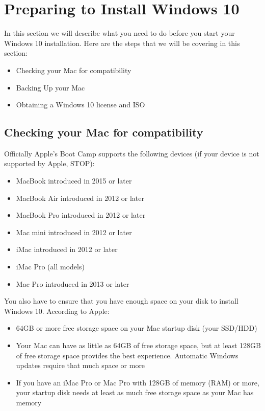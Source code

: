 \documentclass[11pt,twoside,titlepage]{article}
\begin{document}
\section{Preparing to Install Windows 10}

In this section we will describe what you need to do before you start your Windows 10 installation. Here are the steps that we will be covering in this section:
\begin{itemize}

    \item Checking your Mac for compatibility
    \item Backing Up your Mac
    \item Obtaining a Windows 10 license and ISO
\end{itemize}

\subsection{Checking your Mac for compatibility}

Officially Apple's Boot Camp supports the following devices (if your device is not supported by Apple, STOP):

\begin{itemize}
    \item MacBook introduced in 2015 or later
    \item MacBook Air introduced in 2012 or later
    \item MacBook Pro introduced in 2012 or later
    \item Mac mini introduced in 2012 or later
    \item iMac introduced in 2012 or later
    \item iMac Pro (all models)
    \item Mac Pro introduced in 2013 or later
\end{itemize}

You also have to ensure that you have enough space on your disk to install Windows 10. According to Apple:

\begin{itemize}
    \item 64GB or more free storage space on your Mac startup disk (your SSD/HDD)
    \item Your Mac can have as little as 64GB of free storage space, but at least 128GB of free storage space provides the best experience. Automatic Windows updates require that much space or more
    \item If you have an iMac Pro or Mac Pro with 128GB of memory (RAM) or more, your startup disk needs at least as much free storage space as your Mac has memory
\end{itemize}
\end{document}
